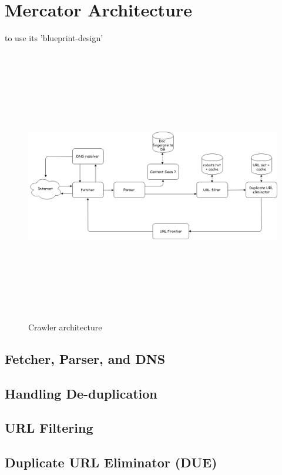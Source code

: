 \section{Mercator Architecture}\label{blueprint}
to use its 'blueprint-design'

\begin{figure}[h!]
  \centering
  \includegraphics[width=15cm,height=12cm,keepaspectratio]{../media/crawler/basic-crawler-architecture-v2.png}
  \caption{Crawler architecture}
  \label{fig:basicarch}
\end{figure}

\subsection{Fetcher, Parser, and DNS}
\subsection{Handling De-duplication}
\subsection{URL Filtering}
\subsection{Duplicate URL Eliminator (DUE)}

